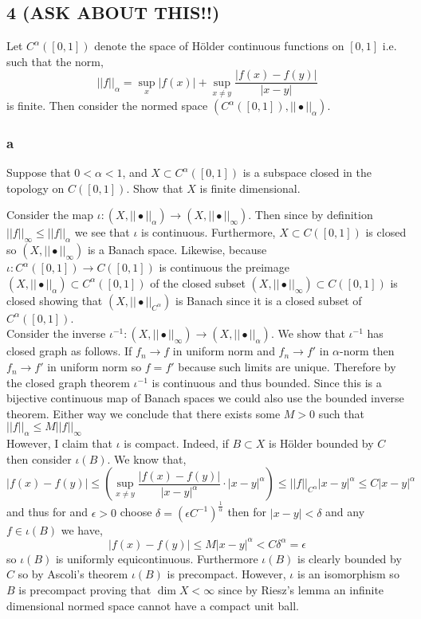\documentclass[12pt]{article}
\begin{document}
\subsection{4 (ASK ABOUT THIS!!)}

Let $C^\alpha([0, 1])$ denote the space of H\"{o}lder continuous functions on $[0, 1]$ i.e. such that the norm,
\[ || f ||_{\alpha} = \sup_x | f(x) | + \sup_{x \neq y} \frac{|f(x) - f(y)|}{|x - y|} \]
is finite. Then consider the normed space $(C^\alpha([0,1]), || \bullet ||_\alpha)$.

\subsubsection{a}

\begin{exercise}
Suppose that $0 < \alpha < 1$, and $X \subset C^\alpha([0, 1])$ is a subspace closed in the topology on $C([0, 1])$. Show that $X$ is finite dimensional. 
\end{exercise}

Consider the map $\iota : (X, || \bullet ||_\alpha) \to (X, || \bullet ||_\infty)$. Then since by definition $|| f ||_{\infty} \le || f ||_{\alpha}$ we see that $\iota$ is continuous. Furthermore, $X \subset C([0,1])$ is closed so $(X, || \bullet ||_\infty)$ is a Banach space. Likewise, because $\iota : C^\alpha([0,1]) \to C([0,1])$ is continuous the preimage $(X, || \bullet ||_\alpha) \subset C^\alpha([0,1])$ of the closed subset $(X, || \bullet ||_{\infty}) \subset C([0,1])$ is closed showing that $(X, || \bullet ||_{C^\alpha})$ is Banach since it is a closed subset of $C^\alpha([0,1])$.
\bigskip\\
Consider the inverse $\iota^{-1} : (X, || \bullet ||_\infty) \to (X, || \bullet||_\alpha)$. We show that $\iota^{-1}$ has closed graph as follows. If $f_n \to f$ in uniform norm and $f_n \to f'$ in $\alpha$-norm then $f_n \to f'$ in uniform norm so $f = f'$ because such limits are unique. Therefore by the closed graph theorem $\iota^{-1}$ is continuous and thus bounded. Since this is a bijective continuous map of Banach spaces we could also use the bounded inverse theorem. Either way we conclude that there exists some $M > 0$ such that $|| f ||_\alpha \le M || f ||_{\infty}$ 
\bigskip\\
However, I claim that $\iota$ is compact. Indeed, if $B \subset X$ is H\"{o}lder bounded by $C$ then consider $\iota(B)$. We know that,
\[ | f(x) - f(y) | \le \left( \sup_{x \neq y} \frac{|f(x) - f(y)|}{|x - y|^\alpha} \cdot | x - y |^\alpha  \right) \le || f ||_{C^\alpha} | x - y|^\alpha \le C | x - y|^\alpha \] 
and thus for and $\epsilon > 0$ choose $\delta = (\epsilon C^{-1})^{\frac{1}{\alpha}}$ then for $|x - y | < \delta$ and any $f \in \iota(B)$ we have,
\[ |f(x) - f(y)| \le M | x - y|^\alpha < C \delta^\alpha = \epsilon \]
so $\iota(B)$ is uniformly equicontinuous. Furthermore $\iota(B)$ is clearly bounded by $C$ so by Ascoli's theorem $\iota(B)$ is precompact. However, $\iota$ is an isomorphism so $B$ is precompact proving that $\dim{X} < \infty$ since by Riesz's lemma an infinite dimensional normed space cannot have a compact unit ball. 
\end{document}
